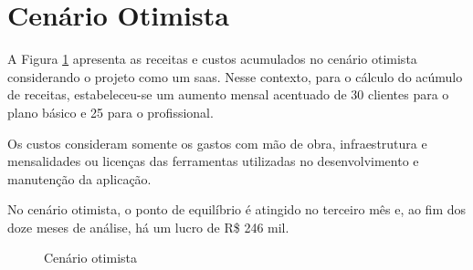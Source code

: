 \section{Cenário Otimista}

A Figura \ref{fig:cenario-otimista} apresenta as receitas e custos acumulados no cenário otimista considerando o projeto como um \gls{saas}. Nesse contexto, para o cálculo do acúmulo de receitas, estabeleceu-se um aumento mensal acentuado de 30 clientes para o plano básico e 25 para o profissional.

Os custos consideram somente os gastos com mão de obra, infraestrutura e mensalidades ou licenças das ferramentas utilizadas no desenvolvimento e manutenção da aplicação.

No cenário otimista, o ponto de equilíbrio é atingido no terceiro mês e, ao fim dos doze meses de análise, há um lucro de R\$ 246 mil.

\begin{figure}[h]
	\centering
	\caption{Cenário otimista}
	\label{fig:cenario-otimista}
\end{figure}
